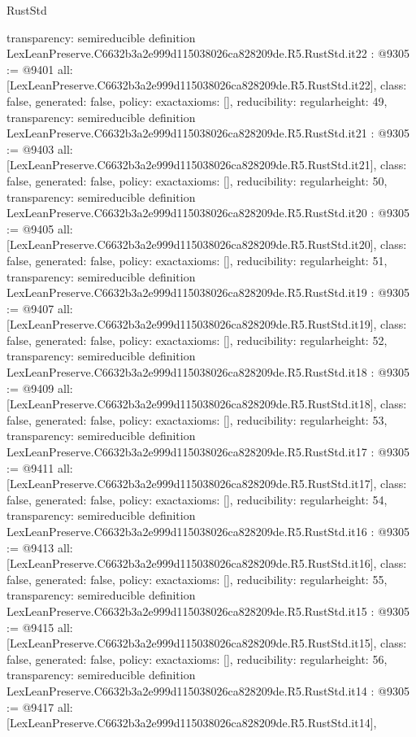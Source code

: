 \begin{lexlean}{RustStd}
\begin{coremodule}
{  transparency: semireducible
}
definition LexLeanPreserve.C6632b3a2e999d115038026ca828209de.R5.RustStd.it22 : @9305 := @9401 {
  all: [LexLeanPreserve.C6632b3a2e999d115038026ca828209de.R5.RustStd.it22],
  class: false,
  generated: false,
  policy: exact{axioms: []},
  reducibility: regular{height: 49},
  transparency: semireducible
}
definition LexLeanPreserve.C6632b3a2e999d115038026ca828209de.R5.RustStd.it21 : @9305 := @9403 {
  all: [LexLeanPreserve.C6632b3a2e999d115038026ca828209de.R5.RustStd.it21],
  class: false,
  generated: false,
  policy: exact{axioms: []},
  reducibility: regular{height: 50},
  transparency: semireducible
}
definition LexLeanPreserve.C6632b3a2e999d115038026ca828209de.R5.RustStd.it20 : @9305 := @9405 {
  all: [LexLeanPreserve.C6632b3a2e999d115038026ca828209de.R5.RustStd.it20],
  class: false,
  generated: false,
  policy: exact{axioms: []},
  reducibility: regular{height: 51},
  transparency: semireducible
}
definition LexLeanPreserve.C6632b3a2e999d115038026ca828209de.R5.RustStd.it19 : @9305 := @9407 {
  all: [LexLeanPreserve.C6632b3a2e999d115038026ca828209de.R5.RustStd.it19],
  class: false,
  generated: false,
  policy: exact{axioms: []},
  reducibility: regular{height: 52},
  transparency: semireducible
}
definition LexLeanPreserve.C6632b3a2e999d115038026ca828209de.R5.RustStd.it18 : @9305 := @9409 {
  all: [LexLeanPreserve.C6632b3a2e999d115038026ca828209de.R5.RustStd.it18],
  class: false,
  generated: false,
  policy: exact{axioms: []},
  reducibility: regular{height: 53},
  transparency: semireducible
}
definition LexLeanPreserve.C6632b3a2e999d115038026ca828209de.R5.RustStd.it17 : @9305 := @9411 {
  all: [LexLeanPreserve.C6632b3a2e999d115038026ca828209de.R5.RustStd.it17],
  class: false,
  generated: false,
  policy: exact{axioms: []},
  reducibility: regular{height: 54},
  transparency: semireducible
}
definition LexLeanPreserve.C6632b3a2e999d115038026ca828209de.R5.RustStd.it16 : @9305 := @9413 {
  all: [LexLeanPreserve.C6632b3a2e999d115038026ca828209de.R5.RustStd.it16],
  class: false,
  generated: false,
  policy: exact{axioms: []},
  reducibility: regular{height: 55},
  transparency: semireducible
}
definition LexLeanPreserve.C6632b3a2e999d115038026ca828209de.R5.RustStd.it15 : @9305 := @9415 {
  all: [LexLeanPreserve.C6632b3a2e999d115038026ca828209de.R5.RustStd.it15],
  class: false,
  generated: false,
  policy: exact{axioms: []},
  reducibility: regular{height: 56},
  transparency: semireducible
}
definition LexLeanPreserve.C6632b3a2e999d115038026ca828209de.R5.RustStd.it14 : @9305 := @9417 {
  all: [LexLeanPreserve.C6632b3a2e999d115038026ca828209de.R5.RustStd.it14],
}
\end{coremodule}
\end{lexlean}
